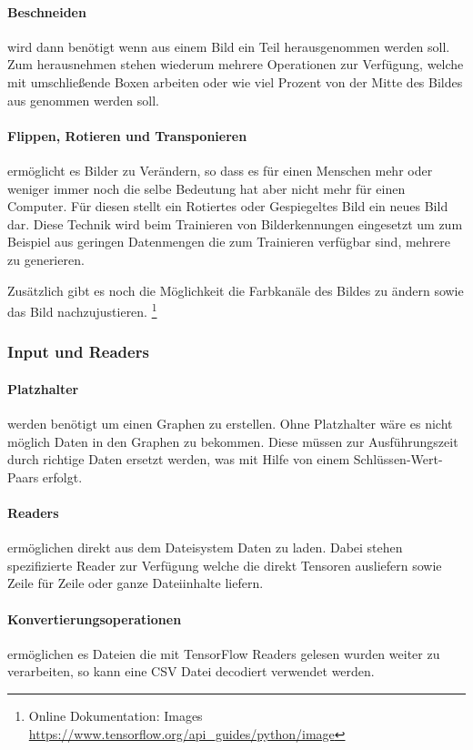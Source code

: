 \paragraph{Beschneiden} wird dann benötigt wenn aus einem Bild ein Teil herausgenommen werden soll. 
Zum herausnehmen stehen wiederum mehrere Operationen zur Verfügung, welche mit umschließende Boxen arbeiten oder wie viel Prozent von der Mitte des Bildes aus genommen werden soll.

\paragraph{Flippen, Rotieren und Transponieren} ermöglicht es Bilder zu Verändern, so dass es für einen Menschen mehr oder weniger immer noch die selbe Bedeutung hat aber nicht mehr für einen Computer. 
Für diesen stellt ein Rotiertes oder Gespiegeltes Bild ein neues Bild dar. 
Diese Technik wird beim Trainieren von Bilderkennungen eingesetzt um zum Beispiel aus geringen Datenmengen die zum Trainieren verfügbar sind, mehrere zu generieren.
\phantom \newline

\noindent
Zusätzlich gibt es noch die Möglichkeit die Farbkanäle des Bildes zu ändern sowie das Bild nachzujustieren. 
\footnote{Online Dokumentation: Images \url{https://www.tensorflow.org/api_guides/python/image}}

\subsubsection{Input und Readers}

\paragraph{Platzhalter} werden benötigt um einen Graphen zu erstellen. 
Ohne Platzhalter wäre es nicht möglich Daten in den Graphen zu bekommen. 
Diese müssen zur Ausführungszeit durch richtige Daten ersetzt werden, was mit Hilfe von einem Schlüssen-Wert-Paars erfolgt. 

\paragraph{Readers} ermöglichen direkt aus dem Dateisystem Daten zu laden. 
Dabei stehen spezifizierte Reader zur Verfügung welche die direkt Tensoren ausliefern sowie Zeile für Zeile  oder ganze Dateiinhalte liefern. 

\paragraph{Konvertierungsoperationen} ermöglichen es Dateien die mit TensorFlow Readers gelesen wurden weiter zu verarbeiten, so kann eine CSV Datei decodiert verwendet werden.
\phantom \newline

